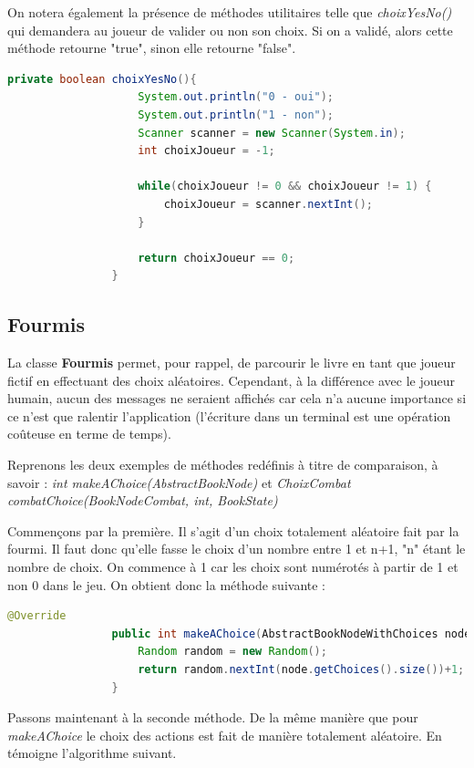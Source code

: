 			On notera également la présence de méthodes utilitaires telle que \textit{choixYesNo()} qui demandera au joueur de valider ou non son choix. Si on a validé, alors cette méthode retourne "true", sinon elle retourne "false".

			\begin{lstlisting}[gobble=16, language=java, caption=méthode utilitaire choixYesNo]
				private boolean choixYesNo(){
					System.out.println("0 - oui");
					System.out.println("1 - non");
					Scanner scanner = new Scanner(System.in);
					int choixJoueur = -1;

					while(choixJoueur != 0 && choixJoueur != 1) {
						choixJoueur = scanner.nextInt();
					}

					return choixJoueur == 0;
				}
			\end{lstlisting}

		\subsection{Fourmis}
			\label{subsec:fourmis}

			La classe \textbf{Fourmis} permet, pour rappel, de parcourir le livre en tant que joueur fictif en effectuant des choix aléatoires. Cependant, à la différence avec le joueur humain, aucun des messages ne seraient affichés car cela n'a aucune importance si ce n'est que ralentir l'application (l'écriture dans un terminal est une opération coûteuse en terme de temps).

			Reprenons les deux exemples de méthodes redéfinis à titre de comparaison, à savoir : \textit{int makeAChoice(AbstractBookNode)} et \textit{ChoixCombat combatChoice(BookNodeCombat, int, BookState)}

			Commençons par la première. Il s'agit d'un choix totalement aléatoire fait par la fourmi. Il faut donc qu'elle fasse le choix d'un nombre entre 1 et n+1, "n" étant le nombre de choix. On commence à 1 car les choix sont numérotés à partir de 1 et non 0 dans le jeu. On obtient donc la méthode suivante :

			\begin{lstlisting}[gobble=16, language=java, caption=makeAChoice() de Fourmi]
				@Override
				public int makeAChoice(AbstractBookNodeWithChoices node) {
					Random random = new Random();
					return random.nextInt(node.getChoices().size())+1;
				}
			\end{lstlisting}

			Passons maintenant à la seconde méthode. De la même manière que pour \textit{makeAChoice} le choix des actions est fait de manière totalement aléatoire. En témoigne l'algorithme suivant.

